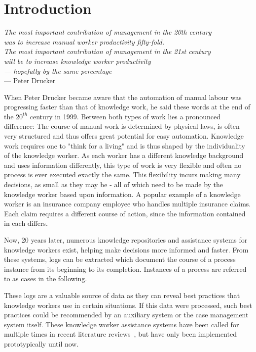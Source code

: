 \chapter{Introduction}\label{sec:intro}
\begin{flushright}{\slshape    
The most important contribution of management in the 20th century\\
was to increase manual worker productivity fifty-fold.\\
The most important contribution of management in the 21st century\\
will be to increase knowledge worker productivity\\
— hopefully by the same percentage} \\ \medskip
--- Peter Drucker~\cite{drucker1999}
\end{flushright}

When Peter Drucker became aware that the automation of manual labour was progressing faster than that of knowledge work, he said these words at the end of the $20^{th}$ century in 1999. Between both types of work lies a pronounced difference: The course of manual work is determined by physical laws, is often very structured and thus offers great potential for easy automation. Knowledge work requires one to "think for a living" and is thus shaped by the individuality of the knowledge worker. As each worker has a different knowledge background and uses information differently, this type of work is very flexible and often no process is ever executed exactly the same. This flexibility incurs making many decisions, as small as they may be - all of which need to be made by the knowledge worker based upon information. A popular example of a knowledge worker is an insurance company employee who handles multiple insurance claims. Each claim requires a different course of action, since the information contained in each differs.

Now, 20 years later, numerous knowledge repositories and assistance systems for knowledge workers exist, helping make decisions more informed and faster. From these systems, logs can be extracted which document the course of a process instance from its beginning to its completion. Instances of a process are referred to as cases in the following.

These logs are a valuable source of data as they can reveal best practices that knowledge workers use in certain situations. If this data were processed, such best practices could be recommended by an auxiliary system or the case management system itself. These knowledge worker assistance systems have been called for multiple times in recent literature reviews~\cite{hauder2014, francescomarino2018}, but have only been implemented prototypically until now.


